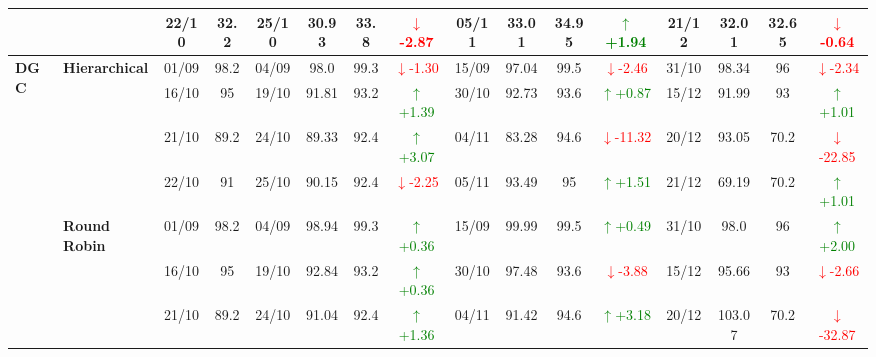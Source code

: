 {\begin{longtable}{llcc|cccc|cccc|cccc}
&
& 22/10 & 32.2 & 25/10 & 30.93 & 33.8 & \textcolor{red}{\(\downarrow\)-2.87} & 05/11 & 33.01 & 34.95 & \textcolor{green}{\(\uparrow\)+1.94} & 21/12 & 32.01 & 32.65 & \textcolor{red}{\(\downarrow\)-0.64} \\
\midrule




\multirow{12}{*}{\textbf{DGC}} 
& \textbf{Hierarchical}
& 01/09 & 98.2 & 04/09 & 98.0 & 99.3 & \textcolor{red}{\(\downarrow\)-1.30} & 15/09 & 97.04 & 99.5 & \textcolor{red}{\(\downarrow\)-2.46} & 31/10 & 98.34 & 96 & \textcolor{red}{\(\downarrow\)-2.34} \\

&
& 16/10 & 95 & 19/10 & 91.81 & 93.2 & \textcolor{green}{\(\uparrow\)+1.39} & 30/10 & 92.73 & 93.6 & \textcolor{green}{\(\uparrow\)+0.87} & 15/12 & 91.99 & 93 & \textcolor{green}{\(\uparrow\)+1.01} \\

&
& 21/10 & 89.2 & 24/10 & 89.33 & 92.4 & \textcolor{green}{\(\uparrow\)+3.07} & 04/11 & 83.28 & 94.6 & \textcolor{red}{\(\downarrow\)-11.32} & 20/12 & 93.05 & 70.2 & \textcolor{red}{\(\downarrow\)-22.85} \\

&
& 22/10 & 91 & 25/10 & 90.15 & 92.4 & \textcolor{red}{\(\downarrow\)-2.25} & 05/11 & 93.49 & 95 & \textcolor{green}{\(\uparrow\)+1.51} & 21/12 & 69.19 & 70.2 & \textcolor{green}{\(\uparrow\)+1.01} \\
\cmidrule(lr){2-16}


& \textbf{Round Robin}
& 01/09 & 98.2 & 04/09 & 98.94 & 99.3 & \textcolor{green}{\(\uparrow\)+0.36} & 15/09 & 99.99 & 99.5 & \textcolor{green}{\(\uparrow\)+0.49} & 31/10 & 98.0 & 96 & \textcolor{green}{\(\uparrow\)+2.00} \\

&
& 16/10 & 95 & 19/10 & 92.84 & 93.2 & \textcolor{green}{\(\uparrow\)+0.36} & 30/10 & 97.48 & 93.6 & \textcolor{red}{\(\downarrow\)-3.88} & 15/12 & 95.66 & 93 & \textcolor{red}{\(\downarrow\)-2.66} \\

&
& 21/10 & 89.2 & 24/10 & 91.04 & 92.4 & \textcolor{green}{\(\uparrow\)+1.36} & 04/11 & 91.42 & 94.6 & \textcolor{green}{\(\uparrow\)+3.18} & 20/12 & 103.07 & 70.2 & \textcolor{red}{\(\downarrow\)-32.87} \\


\end{longtable}}
